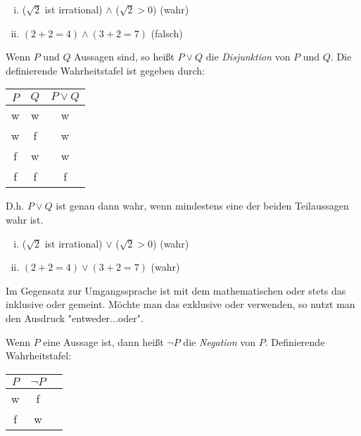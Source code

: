 \begin{example}
    \begin{enumerate}[(i)]
        \item
        ($\sqrt{2}$ ist irrational) $\wedge$ ($\sqrt{2} > 0$) (wahr)
        \item
        $(2 + 2 = 4) \wedge (3 + 2 = 7)$ (falsch)
    \end{enumerate}
\end{example}

\begin{mydef}
    Wenn $P$ und $Q$ Aussagen sind, so heißt $P \vee Q$ die \textit{Disjunktion} von $P$ und $Q$.
    Die definierende Wahrheitstafel ist gegeben durch: \newline
    \begin{tabular}{ c | c | c }
        $P$ & $Q$ & $P \vee Q$ \\
        \hline
        w & w & w \\
        w & f & w \\
        f & w & w \\
        f & f & f \\
    \end{tabular}
    \newline 
    D.h. $P \vee Q$ ist genau dann wahr, wenn mindestens eine der beiden Teilaussagen wahr ist.
\end{mydef}

\begin{example}
    \begin{enumerate}[(i)]
        \item
        ($\sqrt{2}$ ist irrational) $\vee$ ($\sqrt{2} > 0$) (wahr)
        \item
        $(2 + 2 = 4) \vee (3 + 2 = 7)$ (wahr)
    \end{enumerate}
\end{example}

\begin{remark}
    Im Gegensatz zur Umgangssprache ist mit dem mathematischen oder stets das inklusive oder gemeint.
    Möchte man das exklusive oder verwenden, so nutzt man den Ausdruck "entweder...oder".
\end{remark}

\begin{mydef}
    Wenn $P$ eine Aussage ist, dann heißt $\neg P$ die \textit{Negation} von $P$.
    Definierende Wahrheitstafel: \newline
    \begin{tabular}{ c | c | c }
        $P$ &  $\neg P$ \\
        \hline
        w & f  \\
        f & w  \\
    \end{tabular}
\end{mydef}

